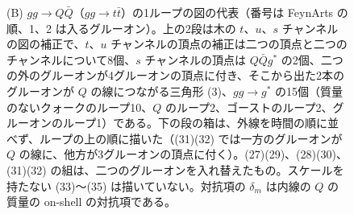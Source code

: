 \documentclass[a4paper,10pt]{ltjsarticle}
\begin{document}
\begin{figure}[tbp]
\caption{(B) $gg\to Q\bar Q$（$gg\to t\bar t$）の1ループの図の代表（番号は FeynArts の順、1、2 は入るグルーオン）。上の2段は木の $t$、$u$、$s$ チャンネルの図の補正で、$t$、$u$ チャンネルの頂点の補正は二つの頂点と二つのチャンネルについて8個、$s$ チャンネルの頂点は $Q\bar Qg^*$ の2個、二つの外のグルーオンが4グルーオンの頂点に付き、そこから出た2本のグルーオンが $Q$ の線につながる三角形 (3)、$gg\to g^*$ の15個（質量のないクォークのループ10、$Q$ のループ2、ゴーストのループ2、グルーオンのループ1）である。下の段の箱は、外線を時間の順に並べず、ループの上の順に描いた（(31)(32) では一方のグルーオンが $Q$ の線に、他方が3グルーオンの頂点に付く）。(27)(29)、(28)(30)、(31)(32) の組は、二つのグルーオンを入れ替えたもの。スケールを持たない (33)〜(35) は描いていない。対抗項の $\delta_m$ は内線の $Q$ の質量の on-shell の対抗項である。}
\label{fig:scatB}
\end{figure}
\end{document}
